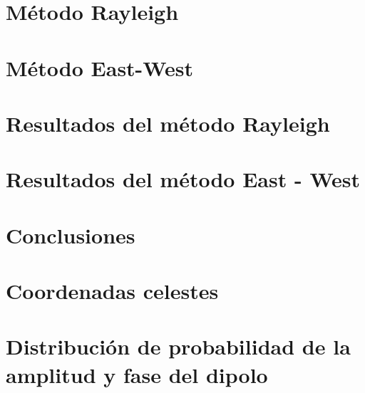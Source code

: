 \documentclass[12pt,papel,twoside,pagebackref]{ibtesis}
\begin{document}
	
\chapter{Método Rayleigh}
	\graphicspath{{../05_MetodoRayleigh/}}
	

\chapter{Método East-West}
	\graphicspath{{../EW/}}
	
	


\chapter{Resultados del método Rayleigh}
	\graphicspath{{../Dipole_1-2_EeVReport/}}
	


\chapter{Resultados del método East - West}
	\graphicspath{{../EW/}}	
	

\chapter{Conclusiones}
\graphicspath{{../Conclusiones/}}	
	

\appendix
	\chapter{Coordenadas celestes}
	\graphicspath{{../Apendice/}}	
	

	\chapter{Distribución de probabilidad de la amplitud y fase del dipolo} \label{PDFs}
	\graphicspath{{../EW/}}
	

\begin{biblio}
	
\end{biblio}
\end{document}
